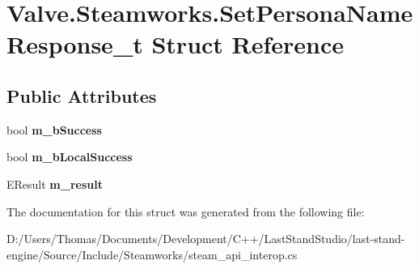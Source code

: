 \hypertarget{structValve_1_1Steamworks_1_1SetPersonaNameResponse__t}{}\section{Valve.\+Steamworks.\+Set\+Persona\+Name\+Response\+\_\+t Struct Reference}
\label{structValve_1_1Steamworks_1_1SetPersonaNameResponse__t}
\subsection*{Public Attributes}
\begin{DoxyCompactItemize}
\item 
\hypertarget{structValve_1_1Steamworks_1_1SetPersonaNameResponse__t_a345a1855a6f19feb15d443ff6b04b1b7}{}bool {\bfseries m\+\_\+b\+Success}\label{structValve_1_1Steamworks_1_1SetPersonaNameResponse__t_a345a1855a6f19feb15d443ff6b04b1b7}

\item 
\hypertarget{structValve_1_1Steamworks_1_1SetPersonaNameResponse__t_a8eb4e63d6b807997225b2f328dc830f8}{}bool {\bfseries m\+\_\+b\+Local\+Success}\label{structValve_1_1Steamworks_1_1SetPersonaNameResponse__t_a8eb4e63d6b807997225b2f328dc830f8}

\item 
\hypertarget{structValve_1_1Steamworks_1_1SetPersonaNameResponse__t_aed28df88ab9e44f4ceb8b9dc45fa6812}{}E\+Result {\bfseries m\+\_\+result}\label{structValve_1_1Steamworks_1_1SetPersonaNameResponse__t_aed28df88ab9e44f4ceb8b9dc45fa6812}

\end{DoxyCompactItemize}


The documentation for this struct was generated from the following file\+:\begin{DoxyCompactItemize}
\item 
D\+:/\+Users/\+Thomas/\+Documents/\+Development/\+C++/\+Last\+Stand\+Studio/last-\/stand-\/engine/\+Source/\+Include/\+Steamworks/steam\+\_\+api\+\_\+interop.\+cs\end{DoxyCompactItemize}
